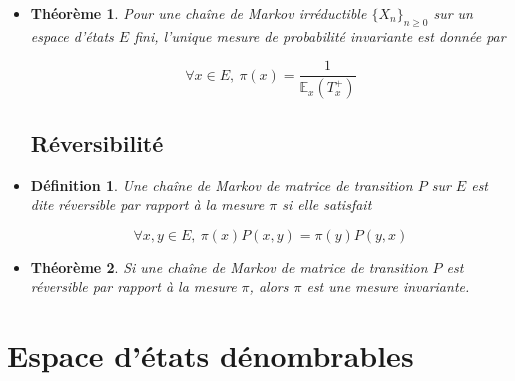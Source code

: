\documentclass[10pt,a4paper,oneside]{article}
\newtheorem{theoreme}{Théorème}
\newtheorem{lemme}{Lemme}
\newtheorem{definition}{Définition}
\begin{document}
\begin{itemize}
\begin{lemme}
\[ \forall x,y \in E,\ \mathbb{E}_x(T_y^+) < \infty \]
\end{lemme}

\textbf{Conséquence:} Si $E$ est fini, alors $T_x^+ < \infty$ presque sûrement.

\item
\begin{theoreme}
Pour une chaîne de Markov irréductible $\{ X_n \}_{n \geq 0}$ sur un espace d'états $E$ fini, l'unique mesure de probabilité invariante est donnée par

\[ \boxed{ \forall x \in E,\ \pi(x) = \frac{1}{\mathbb{E}_x(T_x^+)} } \]
\end{theoreme}

\subsection{Réversibilité}

\item
\begin{definition}
Une chaîne de Markov de matrice de transition $P$ sur $E$ est dite réversible par rapport à la mesure $\pi$ si elle satisfait

\[ \forall x,y \in E,\ \pi(x) P(x,y) = \pi(y) P(y,x) \]
\end{definition}

\item
\begin{theoreme}
Si une chaîne de Markov de matrice de transition $P$ est réversible par rapport à la mesure $\pi$, alors $\pi$ est une mesure invariante.
\end{theoreme}

\end{itemize}

\section{Espace d'états dénombrables}
\end{document}
